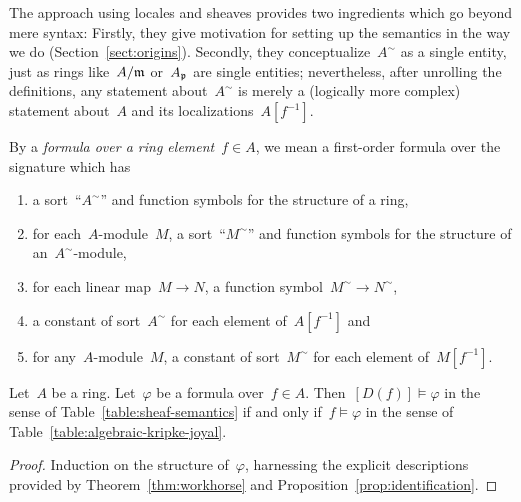 \documentclass{ws-rv9x6}
\begin{document}
{The approach using locales and sheaves provides two ingredients which go beyond
mere syntax: Firstly, they give motivation for setting up the semantics in
the way we do (Section~\ref{sect:origins}). Secondly, they
conceptualize~$A^\sim$ as a single entity, just as rings like~$A/\mathfrak{m}$
or~$A_{\mathfrak{p}}$ are single entities; nevertheless, after unrolling the definitions,
any statement about~$A^\sim$ is merely a (logically more complex) statement
about~$A$ and its localizations~$A[f^{-1}]$.

By a \emph{formula over a ring element}~$f \in A$, we mean a
first-order formula over the signature which has
\begin{enumerate}
\item a sort~``$A^\sim$'' and function symbols for the structure of a ring,
\item for each~$A$-module~$M$, a sort~``$M^\sim$'' and function symbols for the
structure of an~$A^\sim$-module,
\item for each linear map~$M \to N$, a function symbol~$M^\sim \to N^\sim$,
\item a constant of sort~$A^\sim$ for each element of~$A[f^{-1}]$ and
\item for any~$A$-module~$M$, a constant of sort~$M^\sim$ for each element of~$M[f^{-1}]$.
\end{enumerate}

\begin{corollary}\label{cor:algebraic-reformulation}
Let~$A$ be a ring. Let~$\varphi$ be a formula over~$f \in A$.
Then~$[D(f)] \models \varphi$ in the sense of Table~\ref{table:sheaf-semantics} if and only
if~$f \models \varphi$ in the sense of Table~\ref{table:algebraic-kripke-joyal}.
\end{corollary}

\begin{proof}Induction on the structure of~$\varphi$, harnessing the explicit
descriptions provided by Theorem~\ref{thm:workhorse} and
Proposition~\ref{prop:identification}.\end{proof}

}
\end{document}
